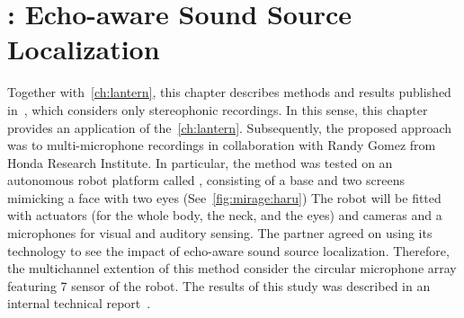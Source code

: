 \chapter{: Echo-aware Sound Source Localization}\label{ch:mirage}


 \synopsisChMirage

\mynewline
Together with~\cref{ch:lantern}, this chapter describes methods and results published in~\cite{di2019mirage}, which considers only stereophonic recordings.
In this sense, this chapter provides an application of the~\cref{ch:lantern}.
Subsequently, the proposed approach was to multi-microphone recordings in collaboration with Randy Gomez from Honda Research Institute.
In particular, the method was tested on an autonomous robot platform called , consisting of a base and two screens mimicking a face with two eyes (See~\cref{fig:mirage:haru})
The robot will be fitted with actuators (for the whole body, the neck, and the eyes) and cameras and a microphones for visual and auditory sensing.
The partner agreed on using its technology to see the impact of echo-aware sound source localization.
Therefore, the multichannel extention of this method consider the circular microphone array featuring 7 sensor of the  robot.
The results of this study was described in an internal technical report~.


